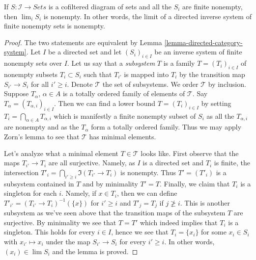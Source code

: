 \begin{lemma}
\label{lemma-nonempty-limit}
If $S : \mathcal{I} \to \textit{Sets}$ is a cofiltered diagram of sets
and all the $S_i$ are finite nonempty, then $\lim_i S_i$ is nonempty.
In other words, the limit of a directed inverse system of finite nonempty sets
is nonempty.
\end{lemma}

\begin{proof}
The two statements are equivalent by
Lemma \ref{lemma-directed-category-system}.
Let $I$ be a directed set and let $(S_i)_{i \in I}$
be an inverse system of finite nonempty sets over $I$.
Let us say that a {\it subsystem} $T$ is a family $T = (T_i)_{i \in I}$
of nonempty subsets $T_i \subset S_i$ such that $T_{i'}$ is mapped
into $T_i$ by the transition map $S_{i'} \to S_i$ for all $i' \geq i$.
Denote $\mathcal{T}$ the set of subsystems. We order $\mathcal{T}$
by inclusion. Suppose $T_\alpha$, $\alpha \in A$ is a totally ordered family
of elements of $\mathcal{T}$. Say $T_\alpha = (T_{\alpha, i})_{i \in I}$.
Then we can find a lower bound $T = (T_i)_{i \in I}$ by setting
$T_i = \bigcap_{\alpha \in A} T_{\alpha, i}$ which is manifestly a
finite nonempty subset of $S_i$ as all the $T_{\alpha, i}$ are nonempty
and as the $T_\alpha$ form a totally ordered family. Thus we may
apply Zorn's lemma to see that $\mathcal{T}$ has minimal elements.

\medskip\noindent
Let's analyze what a minimal element $T \in \mathcal{T}$ looks like.
First observe that the maps $T_{i'} \to T_i$ are all surjective.
Namely, as $I$ is a directed set and $T_i$ is finite,
the intersection $T'_i = \bigcap_{i' \geq i} \Im(T_{i'} \to T_i)$
is nonempty. Thus $T' = (T'_i)$ is a subsystem contained in $T$ and
by minimality $T' = T$. Finally, we claim that $T_i$ is a singleton
for each $i$. Namely, if $x \in T_i$, then we can define
$T'_{i'} = (T_{i'} \to T_i)^{-1}(\{x\})$ for $i' \geq i$ and
$T'_j = T_j$ if $j \not \geq i$. This is another subsystem as we've seen
above that the transition maps of the subsystem $T$ are surjective.
By minimality we see that $T = T'$ which indeed implies that $T_i$
is a singleton. This holds for every $i \in I$, hence we see that
$T_i = \{x_i\}$ for some $x_i \in S_i$ with $x_{i'} \mapsto x_i$
under the map $S_{i'} \to S_i$ for every $i' \geq i$. In other words,
$(x_i) \in \lim S_i$ and the lemma is proved.
\end{proof}






